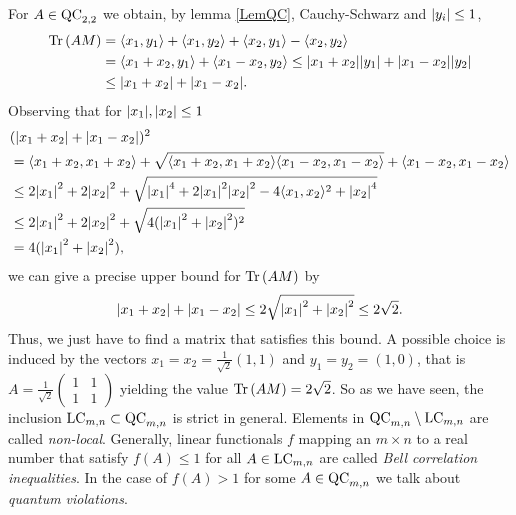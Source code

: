 For $ A \in \textup{QC}_{2,2} $ we obtain, by lemma \ref{LemQC}, Cauchy-Schwarz and $ {\left|{y_i}\right|}\le 1 $,
\begin{align*}
\text{Tr} \, {(AM)} &= \langle x_1,y_1 \rangle + \langle x_1,y_2 \rangle + \langle x_2,y_1 \rangle - \langle x_2,y_2 \rangle   \\
&= \langle x_1+x_2,y_1 \rangle + \langle x_1-x_2,y_2 \rangle  \le {\left|{x_1+x_2}\right|}{\left|{y_1}\right|} + {\left|{x_1-x_2}\right|}{\left|{y_2}\right|}  \\
&\le {\left|{x_1+x_2}\right|} + {\left|{x_1-x_2}\right|}.
\end{align*} 
Observing that for $ {\left|{x_1}\right|},{\left|{x_2}\right|}\le  1 $
\begin{align*}
&({\left|{x_1+x_2}\right|} + {\left|{x_1-x_2}\right|})^2 \\
&= \langle x_1+x_2,x_1+x_2\rangle  +\sqrt{\langle x_1+x_2,x_1+x_2\rangle  \langle x_1-x_2,x_1-x_2\rangle} +  \langle x_1-x_2,x_1-x_2\rangle  \\
&\le 2{\left|{x_1}\right|}^2+2{\left|{x_2}\right|}^2 + \sqrt{{\left|{x_1}\right|}^4+2{\left|{x_1}\right|}^2{\left|{x_2}\right|}^2-4\langle x_1,x_2\rangle^2+{\left|{x_2}\right|}^4}  \\
&\le  2{\left|{x_1}\right|}^2+2{\left|{x_2}\right|}^2 + \sqrt{4({\left|{x_1}\right|}^2+{\left|{x_2}\right|}^2)^2}  \\
&= 4({\left|{x_1}\right|}^2+{\left|{x_2}\right|}^2),
\end{align*}
we can give a precise upper bound for $ \text{Tr} \, {(AM)}  $ by 
\begin{align*}
{\left|{x_1+x_2}\right|} + {\left|{x_1-x_2}\right|} \le 2\sqrt{{\left|{x_1}\right|}^2+{\left|{x_2}\right|}^2} \le 2 \sqrt{2}.
\end{align*}
Thus, we just have to find a matrix that satisfies this bound. A possible choice is induced by the vectors $ x_1 = x_2 = \frac{1}{\sqrt{2}}(1,1) $ and $ y_1 = y_2 =(1,0) $, that is $ A = \frac{1}{\sqrt{2}}\begin{pmatrix}
1 & 1 \\ 1 & 1 
\end{pmatrix} $ yielding the value $ \text{Tr} \, {(AM)}  = 2 \sqrt{2} $.
So as we have seen, the inclusion $ \textup{LC}_{m,n} \subset \textup{QC}_{m,n} $ is strict in general. Elements in $ \textup{QC}_{m,n} \setminus \textup{LC}_{m,n} $ are called {\itshape non-local}.
Generally, linear functionals $ f$ mapping an $ m \times n $ to a real number that satisfy $ f(A) \le 1 $ for all $ A \in \textup{LC}_{m,n} $ are called {\itshape Bell correlation inequalities}. In the case of $ f(A) > 1 $ for some $ A \in \textup{QC}_{m,n} $ we talk about {\itshape quantum violations}. 